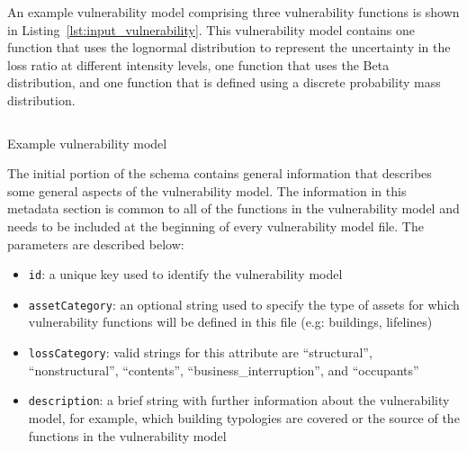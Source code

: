 An example \gls{vulnerability model} comprising three \glspl{vulnerability
function} is shown in Listing~\ref{lst:input_vulnerability}. This
\gls{vulnerability model} contains one function that uses the lognormal
distribution to represent the uncertainty in the loss ratio at different
intensity levels, one function that uses the Beta distribution, and one
function that is defined using a discrete probability mass distribution.

\begin{listing}[htbp]
  \inputminted[firstline=1,firstnumber=1,fontsize=\footnotesize,frame=single,linenos,bgcolor=lightgray]{xml}{oqum/risk/Verbatim/input_vulnerability.xml}
  \caption{Example vulnerability model}
  \label{lst:input_vulnerability}
\end{listing}


The initial portion of the schema contains general information that describes
some general aspects of the \gls{vulnerability model}. The information in this
metadata section is common to all of the functions in the \gls{vulnerability
model} and needs to be included at the beginning of every \gls{vulnerability
model} file. The parameters are described below:

\begin{itemize}

    \item \Verb+id+: a unique key used to identify the \gls{vulnerability model}

    \item \Verb+assetCategory+: an optional string used to specify the type of
    \glspl{asset} for which \glspl{vulnerability function} will be defined in this file 
    (e.g: buildings, lifelines)

    \item \Verb+lossCategory+: valid strings for this attribute are 
    ``structural'', ``nonstructural'', ``contents'',  
    ``business\_interruption'', and ``occupants''

    \item \Verb+description+: a brief string with further information about the
    \gls{vulnerability model}, for example, which building typologies are 
    covered or the source of the functions in the \gls{vulnerability model}

\end{itemize}

\inputminted[firstline=4,firstnumber=4,lastline=8,fontsize=\footnotesize,frame=single,linenos,bgcolor=lightgray]{xml}{oqum/risk/Verbatim/input_vulnerability.xml}



